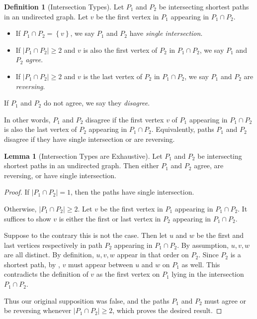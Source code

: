 \documentclass[11pt]{article}
\newcommand{\set}[1]{\left\{#1\right\}}
\theoremstyle{definition}
\newtheorem{lemma}[theorem]{Lemma}
\newtheorem{definition}[theorem]{Definition}
\begin{document}
\begin{definition}[Intersection Types]
    Let $P_1$ and $P_2$ be intersecting shortest paths in an undirected graph.
    Let $v$ be the first vertex in $P_1$ appearing in $P_1\cap P_2$.
\begin{itemize}
    \item If $P_1\cap P_2 = \set{v}$, we say $P_1$ and $P_2$ have \emph{single 
    intersection}.
    \item If $|P_1\cap P_2|\ge 2$ and $v$ is also the first vertex of $P_2$ in $P_1\cap P_2$, we say $P_1$ and $P_2$ \emph{agree}.
    \item 
If $|P_1\cap P_2|\ge 2$ and $v$ is the last vertex of $P_2$ in $P_1\cap P_2$, we say $P_1$ and $P_2$ are \emph{reversing}.
\end{itemize}
If $P_1$ and $P_2$ do not agree, we say they \emph{disagree}.
\end{definition}

In other words, $P_1$ and $P_2$ disagree if the first vertex $v$ of $P_1$ appearing in $P_1\cap P_2$ is also the last vertex of $P_2$ appearing in $P_1\cap P_2$.
Equivalently, paths $P_1$ and $P_2$ disagree if they have single intersection or are reversing.

\begin{lemma}[Intersection Types are Exhaustive]
\label{cor:types}
      Let $P_1$ and $P_2$ be intersecting shortest paths in an undirected graph.
    Then either $P_1$ and $P_2$ agree, are reversing, or have single intersection.  
\end{lemma}
\begin{proof}
    If $|P_1\cap P_2| = 1$, then the paths have single intersection.

    Otherwise, $|P_1\cap P_2| \ge 2$.
Let $v$ be the first vertex in $P_1$ appearing in $P_1\cap P_2$.
It suffices to show $v$ is either the first or last vertex in $P_2$ appearing in $P_1\cap P_2$.

Suppose to the contrary this is not the case.
Then let $u$ and $w$ be the first and last vertices respectively in path $P_2$ appearing in $P_1\cap P_2$.
By assumption, $u,v,w$ are all distinct.
By definition, $u,v,w$ appear in that order on $P_2$.
Since $P_2$ is a shortest path, by , $v$ must appear between $u$ and $w$ on $P_1$ as well.
This contradicts the definition of $v$ as the first vertex on $P_1$ lying in the intersection $P_1\cap P_2$.
    
Thus our original supposition was false, and the paths $P_1$ and $P_2$ must agree or be reversing whenever $|P_1\cap P_2|\ge 2$, which proves the desired result.
\end{proof}
\end{document}
